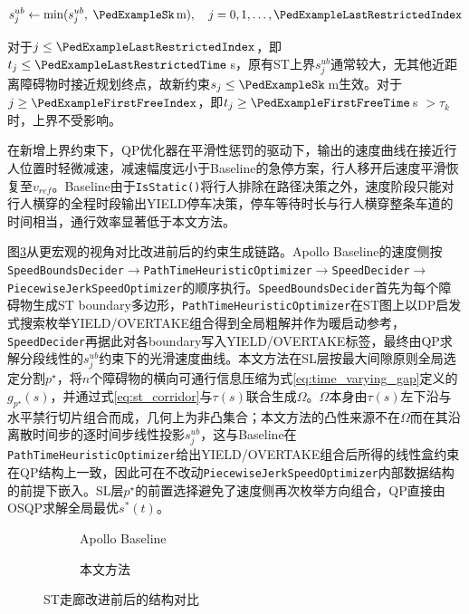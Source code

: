 \begin{equation*}
    s_j^{ub} \leftarrow \min(s_j^{ub},\; \PedExampleSk\,\text{m}), \quad j = 0, 1, \ldots, \PedExampleLastRestrictedIndex
\end{equation*}

对于$j \leq \PedExampleLastRestrictedIndex$，即$t_j \leq \PedExampleLastRestrictedTime$\,s，原有ST上界$s_j^{ub}$通常较大，无其他近距离障碍物时接近规划终点，故新约束$s_j \leq \PedExampleSk$\,m生效。对于$j \geq \PedExampleFirstFreeIndex$，即$t_j \geq \PedExampleFirstFreeTime$\,s $> \tau_k$时，上界不受影响。

在新增上界约束下，QP优化器在平滑性惩罚的驱动下，输出的速度曲线在接近行人位置时轻微减速，减速幅度远小于Baseline的急停方案，行人移开后速度平滑恢复至$v_{ref}$。Baseline由于\texttt{IsStatic()}将行人排除在路径决策之外，速度阶段只能对行人横穿的全程时段输出YIELD停车决策，停车等待时长与行人横穿整条车道的时间相当，通行效率显著低于本文方法。

图\ref{fig:corridor}从更宏观的视角对比改进前后的约束生成链路。Apollo Baseline的速度侧按\texttt{SpeedBoundsDecider}$\to$\texttt{PathTimeHeuristicOptimizer}$\to$\texttt{SpeedDecider}$\to$\texttt{PiecewiseJerkSpeedOptimizer}的顺序执行。\texttt{SpeedBoundsDecider}首先为每个障碍物生成ST boundary多边形，\texttt{PathTimeHeuristicOptimizer}在ST图上以DP启发式搜索枚举YIELD/OVERTAKE组合得到全局粗解并作为暖启动参考，\texttt{SpeedDecider}再据此对各boundary写入YIELD/OVERTAKE标签，最终由QP求解分段线性的$s_j^{ub}$约束下的光滑速度曲线。本文方法在SL层按最大间隙原则全局选定分割$p^\star$，将$n$个障碍物的横向可通行信息压缩为式\eqref{eq:time_varying_gap}定义的$g_{p^\star}(s)$，并通过式\eqref{eq:st_corridor}与$\tau(s)$联合生成$\Omega$。$\Omega$本身由$\tau(s)$左下沿与水平禁行切片组合而成，几何上为非凸集合；本文方法的凸性来源不在$\Omega$而在其沿离散时间步的逐时间步线性投影$s_j^{ub}$，这与Baseline在\texttt{PathTimeHeuristicOptimizer}给出YIELD/OVERTAKE组合后所得的线性盒约束在QP结构上一致，因此可在不改动\texttt{PiecewiseJerkSpeedOptimizer}内部数据结构的前提下嵌入。SL层$p^\star$的前置选择避免了速度侧再次枚举方向组合，QP直接由OSQP求解全局最优$s^*(t)$。

\begin{figure}[htbp]
\centering
\begin{subfigure}[b]{0.48\textwidth}
  \centering
  \caption{Apollo Baseline}
  \label{fig:corridor:a}
\end{subfigure}\hfill
\begin{subfigure}[b]{0.48\textwidth}
  \centering
  \caption{本文方法}
  \label{fig:corridor:b}
\end{subfigure}
\caption{ST走廊改进前后的结构对比}
\label{fig:corridor}
\end{figure}

